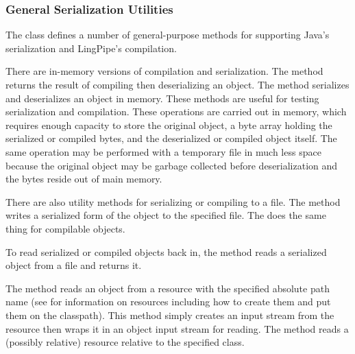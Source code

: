 \subsubsection{General Serialization Utilities}

The  class defines a number of
general-purpose methods for supporting Java's serialization and 
LingPipe's compilation.

There are in-memory versions of compilation and serialization.  The
method  returns the result of compiling then
deserializing an object. The method
 serializes and deserializes
an object in memory.  These methods are useful for testing
serialization and compilation.  These operations are carried out in
memory, which requires enough capacity to store the original object, a
byte array holding the serialized or compiled bytes, and the
deserialized or compiled object itself.  The same operation may be
performed with a temporary file in much less space because the
original object may be garbage collected before deserialization and
the bytes reside out of main memory.

There are also utility methods for serializing or compiling to a file.
The method  writes
a serialized form of the object to the specified file.  The 
 does the same thing for compilable
objects.

To read serialized or compiled objects back in, the method
 reads a serialized object from a file and
returns it.

The method  reads an object from a
resource with the specified absolute path name (see
 for information on resources including
how to create them and put them on the classpath).  This method simply
creates an input stream from the resource then wraps it in an object
input stream for reading.  The
 method reads a (possibly
relative) resource relative to the specified class.  

